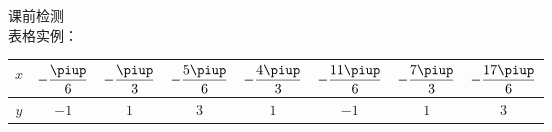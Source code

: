 \Topic{}
  \Teach{}
  \newtheorem*{Theorem}{定理}
  \makefront
\vspace{-1.5em}
\startexercise
\begin{exercise}{\heiti 课前检测}\\
  表格实例：
  \begin{center}
    \renewcommand{\arraystretch}{1.4}
    \begin{tabular}{|*{8}{c|}}
      \hline
        $x$
        &$-\dfrac{\piup}6$
        &$-\dfrac{\piup}3$
        &$-\dfrac{5\piup}6$
        &$-\dfrac{4\piup}3$
        &$-\dfrac{11\piup}6$
        &$-\dfrac{7\piup}3$
        &$-\dfrac{17\piup}6$\\
      \hline
        $y$
        &$-1$
        &$1$
        &$3$
        &$1$
        &$-1$
        &$1$
        &$3$\\
      \hline
    \end{tabular}\\
  \end{center}
\end{exercise}
